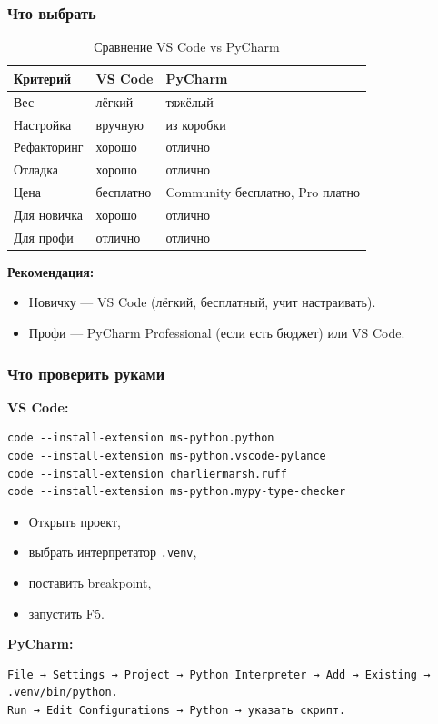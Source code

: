 \subsubsection{ Что выбрать}
\begin{table}[h]
\centering
\begin{tabular}{|l|l|l|}
\hline
\textbf{Критерий} & \textbf{VS Code} & \textbf{PyCharm} \\
\hline
Вес & лёгкий & тяжёлый  \\
Настройка & вручную & из коробки \\
Рефакторинг & хорошо & отлично \\
Отладка & хорошо & отлично \\
Цена & бесплатно & Community бесплатно, Pro платно \\
Для новичка& хорошо & отлично \\
Для профи & отлично & отлично\\
\hline
\end{tabular}
\caption{Сравнение VS Code vs PyCharm}
\label{tab:VSCodeVSPyCharm}
\end{table}

\begin{warningbox2}
\textbf{Рекомендация:}
\begin{itemize}
\item Новичку — VS Code (лёгкий, бесплатный, учит настраивать).
\item Профи — PyCharm Professional (если есть бюджет) или VS Code.
\end{itemize}
\end{warningbox2}

\subsubsection{ Что проверить руками}

\textbf{VS Code:}
\begin{lstlisting}
code --install-extension ms-python.python
code --install-extension ms-python.vscode-pylance
code --install-extension charliermarsh.ruff
code --install-extension ms-python.mypy-type-checker
\end{lstlisting}
\begin{itemize}
\item Открыть проект,
\item выбрать интерпретатор \texttt{.venv},
\item поставить breakpoint,
\item запустить F5.
\end{itemize}
\textbf{PyCharm:}
\begin{lstlisting}
File → Settings → Project → Python Interpreter → Add → Existing → .venv/bin/python.
Run → Edit Configurations → Python → указать скрипт.
\end{lstlisting}

